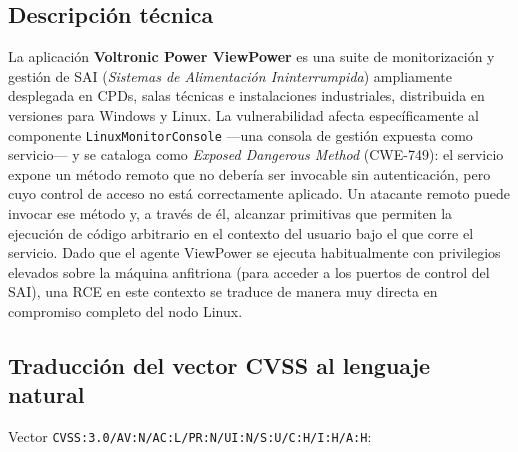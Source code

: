 \subsection*{Descripción técnica}

La aplicación \textbf{Voltronic Power ViewPower} es una suite de monitorización y gestión de SAI (\textit{Sistemas de Alimentación Ininterrumpida}) ampliamente desplegada en CPDs, salas técnicas e instalaciones industriales, distribuida en versiones para Windows y Linux. La vulnerabilidad afecta específicamente al componente \texttt{LinuxMonitorConsole} ---una consola de gestión expuesta como servicio--- y se cataloga como \textit{Exposed Dangerous Method} (CWE-749): el servicio expone un método remoto que no debería ser invocable sin autenticación, pero cuyo control de acceso no está correctamente aplicado. Un atacante remoto puede invocar ese método y, a través de él, alcanzar primitivas que permiten la ejecución de código arbitrario en el contexto del usuario bajo el que corre el servicio. Dado que el agente ViewPower se ejecuta habitualmente con privilegios elevados sobre la máquina anfitriona (para acceder a los puertos de control del SAI), una RCE en este contexto se traduce de manera muy directa en compromiso completo del nodo Linux.

\subsection*{Traducción del vector CVSS al lenguaje natural}

Vector \texttt{CVSS:3.0/AV:N/AC:L/PR:N/UI:N/S:U/C:H/I:H/A:H}:

